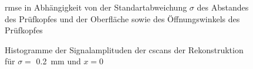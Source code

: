 \hspace{1cm}

\begin{figure}[h!]
\begin{center}
\caption[RMSE$^{\dagger}_{\krit}$ Auswertung der Laufzeitänderung]{\acrshort{rmse} in Abhängigkeit von der Standartabweichung $\sigma$ des Abstandes des Prüfkopfes und der Oberfläche sowie des Öffnungswinkels des Prüfkopfes}
\label{fig:zscan_mse}
\end{center}
\end{figure}




\begin{figure}[h!]
\begin{center}

\caption[Histogrammen im Außenbereich der ROI]{
Histogramme der Signalamplituden der \glspl{cscan} der Rekonstruktion für $\sigma = $ \SI{0.2}{\milli\metre} und $x = 0$}
\label{fig:zscan_histograms}
\end{center}
\end{figure}
